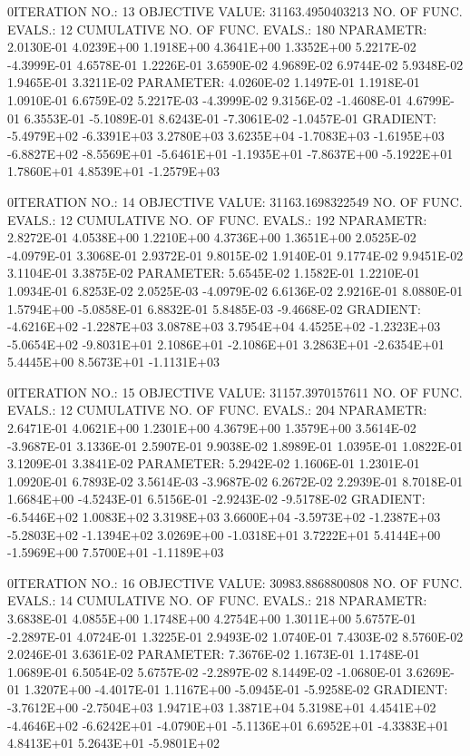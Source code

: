 \documentclass[
  letterpaper,
  toc=chapterentrywithdots,
  listof=totoc,
  11pt,
  headings=small,
  usegeometry]{scrreprt}
\begin{document}
\begin{nonmemlisting}
0ITERATION NO.:   13    OBJECTIVE VALUE:   31163.4950403213        NO. OF FUNC. EVALS.:  12
 CUMULATIVE NO. OF FUNC. EVALS.:      180
 NPARAMETR:  2.0130E-01  4.0239E+00  1.1918E+00  4.3641E+00  1.3352E+00  5.2217E-02 -4.3999E-01  4.6578E-01  1.2226E-01  3.6590E-02
             4.9689E-02  6.9744E-02  5.9348E-02  1.9465E-01  3.3211E-02
 PARAMETER:  4.0260E-02  1.1497E-01  1.1918E-01  1.0910E-01  6.6759E-02  5.2217E-03 -4.3999E-02  9.3156E-02 -1.4608E-01  4.6799E-01
             6.3553E-01 -5.1089E-01  8.6243E-01 -7.3061E-02 -1.0457E-01
 GRADIENT:  -5.4979E+02 -6.3391E+03  3.2780E+03  3.6235E+04 -1.7083E+03 -1.6195E+03 -6.8827E+02 -8.5569E+01 -5.6461E+01 -1.1935E+01
            -7.8637E+00 -5.1922E+01  1.7860E+01  4.8539E+01 -1.2579E+03

0ITERATION NO.:   14    OBJECTIVE VALUE:   31163.1698322549        NO. OF FUNC. EVALS.:  12
 CUMULATIVE NO. OF FUNC. EVALS.:      192
 NPARAMETR:  2.8272E-01  4.0538E+00  1.2210E+00  4.3736E+00  1.3651E+00  2.0525E-02 -4.0979E-01  3.3068E-01  2.9372E-01  9.8015E-02
             1.9140E-01  9.1774E-02  9.9451E-02  3.1104E-01  3.3875E-02
 PARAMETER:  5.6545E-02  1.1582E-01  1.2210E-01  1.0934E-01  6.8253E-02  2.0525E-03 -4.0979E-02  6.6136E-02  2.9216E-01  8.0880E-01
             1.5794E+00 -5.0858E-01  6.8832E-01  5.8485E-03 -9.4668E-02
 GRADIENT:  -4.6216E+02 -1.2287E+03  3.0878E+03  3.7954E+04  4.4525E+02 -1.2323E+03 -5.0654E+02 -9.8031E+01  2.1086E+01 -2.1086E+01
             3.2863E+01 -2.6354E+01  5.4445E+00  8.5673E+01 -1.1131E+03

0ITERATION NO.:   15    OBJECTIVE VALUE:   31157.3970157611        NO. OF FUNC. EVALS.:  12
 CUMULATIVE NO. OF FUNC. EVALS.:      204
 NPARAMETR:  2.6471E-01  4.0621E+00  1.2301E+00  4.3679E+00  1.3579E+00  3.5614E-02 -3.9687E-01  3.1336E-01  2.5907E-01  9.9038E-02
             1.8989E-01  1.0395E-01  1.0822E-01  3.1209E-01  3.3841E-02
 PARAMETER:  5.2942E-02  1.1606E-01  1.2301E-01  1.0920E-01  6.7893E-02  3.5614E-03 -3.9687E-02  6.2672E-02  2.2939E-01  8.7018E-01
             1.6684E+00 -4.5243E-01  6.5156E-01 -2.9243E-02 -9.5178E-02
 GRADIENT:  -6.5446E+02  1.0083E+02  3.3198E+03  3.6600E+04 -3.5973E+02 -1.2387E+03 -5.2803E+02 -1.1394E+02  3.0269E+00 -1.0318E+01
             3.7222E+01  5.4144E+00 -1.5969E+00  7.5700E+01 -1.1189E+03

0ITERATION NO.:   16    OBJECTIVE VALUE:   30983.8868800808        NO. OF FUNC. EVALS.:  14
 CUMULATIVE NO. OF FUNC. EVALS.:      218
 NPARAMETR:  3.6838E-01  4.0855E+00  1.1748E+00  4.2754E+00  1.3011E+00  5.6757E-01 -2.2897E-01  4.0724E-01  1.3225E-01  2.9493E-02
             1.0740E-01  7.4303E-02  8.5760E-02  2.0246E-01  3.6361E-02
 PARAMETER:  7.3676E-02  1.1673E-01  1.1748E-01  1.0689E-01  6.5054E-02  5.6757E-02 -2.2897E-02  8.1449E-02 -1.0680E-01  3.6269E-01
             1.3207E+00 -4.4017E-01  1.1167E+00 -5.0945E-01 -5.9258E-02
 GRADIENT:  -3.7612E+00 -2.7504E+03  1.9471E+03  1.3871E+04  5.3198E+01  4.4541E+02 -4.4646E+02 -6.6242E+01 -4.0790E+01 -5.1136E+01
             6.6952E+01 -4.3383E+01  4.8413E+01  5.2643E+01 -5.9801E+02


\end{nonmemlisting}
\end{document}
